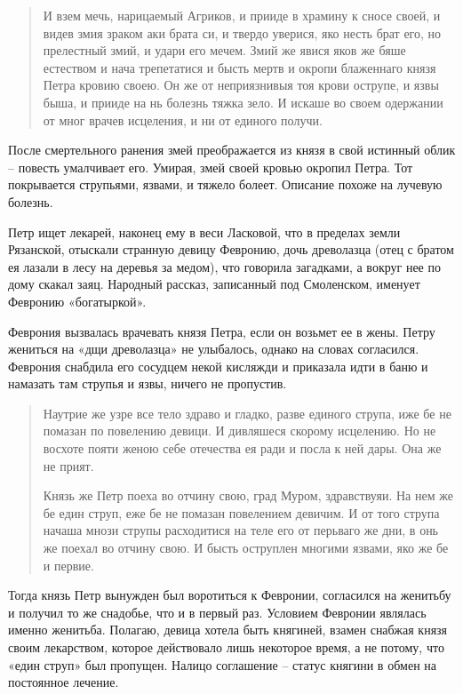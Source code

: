 \begin{quotation}
И взем мечь, нарицаемый Агриков, и прииде в храмину к сносе своей, и видев змия зраком аки брата си, и твердо уверися, яко несть брат его, но прелестный змий, и удари его мечем. Змий же явися яков же бяше естеством и нача трепетатися и бысть мертв и окропи блаженнаго князя Петра кровию своею. Он же от неприязнивыя тоя крови острупе, и язвы быша, и прииде на нь болезнь тяжка зело. И искаше во своем одержании от мног врачев исцеления, и ни от единого получи.
\end{quotation}

После смертельного ранения змей преображается из князя в свой истинный облик – повесть умалчивает его. Умирая, змей своей кровью окропил Петра. Тот покрывается струпьями, язвами, и тяжело болеет. Описание похоже на лучевую болезнь.

Петр ищет лекарей, наконец ему в веси Ласковой, что в пределах земли Рязанской, отыскали странную девицу Февронию, дочь древолазца (отец с братом ея лазали в лесу на деревья за медом), что говорила загадками, а вокруг нее по дому скакал заяц. Народный рассказ, записанный под Смоленском, именует Февронию «богатыркой».

Феврония вызвалась врачевать князя Петра, если он возьмет ее в жены. Петру жениться на «дщи древолазца» не улыбалось, однако на словах согласился. Феврония снабдила его сосудцем некой кисляжди и приказала идти в баню и намазать там струпья и язвы, ничего не пропустив.

\begin{quotation}
Наутрие же узре все тело здраво и гладко, разве единого струпа, иже бе не помазан по повелению девици. И дивляшеся скорому исцелению. Но не восхоте пояти женою себе отечества ея ради и посла к ней дары. Она же не прият.

Князь же Петр поеха во отчину свою, град Муром, здравствуяи. На нем же бе един струп, еже бе не помазан повелением девичим. И от того струпа начаша мнози струпы расходитися на теле его от перьваго же дни, в онь же поехал во отчину свою. И бысть оструплен многими язвами, яко же бе и первие.
\end{quotation}

Тогда князь Петр вынужден был воротиться к Февронии, согласился на женитьбу и получил то же снадобье, что и в первый раз. Условием Февронии являлась именно женитьба. Полагаю, девица хотела быть княгиней, взамен снабжая князя своим лекарством, которое действовало лишь некоторое время, а не потому, что «един струп» был пропущен. Налицо соглашение – статус княгини в обмен на постоянное лечение.

